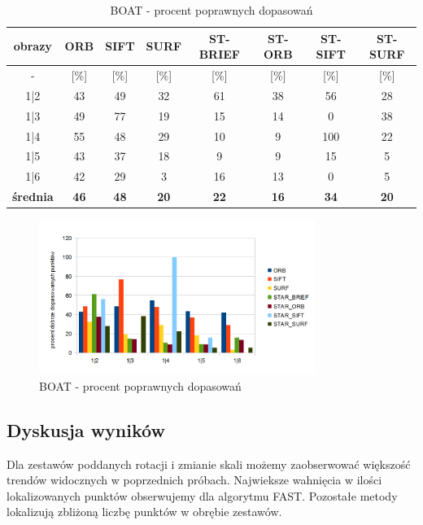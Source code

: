 \begin{table}[htbp]
  \centering
  \caption{BOAT - procent poprawnych dopasowań}
    \begin{tabular}{|c|c|c|c|c|c|c|c|}\hline
    obrazy & \textbf{ORB} & \textbf{SIFT} & \textbf{SURF} & \textbf{ST-BRIEF} & \textbf{ST-ORB} & \textbf{ST-SIFT} & \textbf{ST-SURF} \\\hline
     - & [\%] & [\%] & [\%] & [\%] & [\%] & [\%] & [\%] \\\hline
   
    1|2 & 43 & 49 & 32 & 61 & 38 & 56 & 28 \\
    1|3 & 49 & 77 & 19 & 15 & 14 & 0 & 38 \\
    1|4 & 55 & 48 & 29 & 10 & 9 & 100 & 22 \\
    1|5 & 43 & 37 & 18 & 9 & 9 & 15 & 5 \\
    1|6 & 42 & 29 & 3 & 16 & 13 & 0 & 5 \\\hline
    \textbf{średnia} & \textbf{46} & \textbf{48} & \textbf{20} & \textbf{22} & \textbf{16} & \textbf{34} & \textbf{20} \\\hline
     \end{tabular}%
  \label{tab:boat_m2}%
\end{table}%


\begin{figure}
\centering
\includegraphics[width=0.8\textwidth]{pict/mikolajczyk/boat/m2.png}
\caption{BOAT - procent poprawnych dopasowań}
\label{fig:boat_m2}
\end{figure}
\FloatBarrier
\subsection{Dyskusja wyników}
Dla zestawów poddanych rotacji i zmianie skali możemy zaobserwować większość trendów widocznych w poprzednich próbach. Najwieksze wahnięcia w ilości lokalizowanych punktów obserwujemy dla algorytmu FAST. Pozostałe metody lokalizują zbliżoną liczbę punktów w obrębie zestawów.


